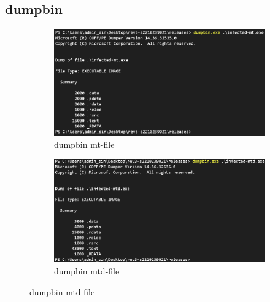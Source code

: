 \documentclass{article}
\begin{document}
	\subsection{dumpbin}
	\begin{figure}[htp]
		\centering
		\begin{subfigure}[b]{0.45\textwidth}
			\includegraphics[width=\textwidth]{pictures/1. dumpbin mt.png}
			\caption{dumpbin mt-file}
			\label{fig:image1}
		\end{subfigure}
		\hfill
		\begin{subfigure}[b]{0.45\textwidth}
			\includegraphics[width=\textwidth]{pictures/1. dumpbin mtd.png}
			\caption{dumpbin mtd-file}
			\label{fig:image2}
		\end{subfigure}
		
		\vspace{10pt} %
		

\end{figure}
\end{document}
